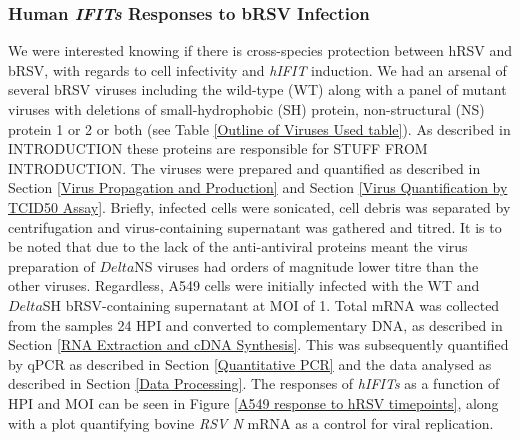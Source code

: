 \subsubsection{Human \textit{IFITs} Responses to bRSV Infection} \label{Human IFITs Responses to bRSV}
We were interested knowing if there is cross-species protection between hRSV and bRSV, with regards to cell infectivity and \textit{hIFIT} induction. We had an arsenal of several bRSV viruses including the wild-type (WT) along with a panel of mutant viruses with deletions of small-hydrophobic (SH) protein, non-structural (NS) protein 1 or 2 or both (see Table \ref{Outline of Viruses Used table}). As described in INTRODUCTION these proteins are responsible for STUFF FROM INTRODUCTION. The viruses were prepared and quantified as described in Section \ref{Virus Propagation and Production} and Section \ref{Virus Quantification by TCID50 Assay}. Briefly, infected cells were sonicated, cell debris was separated by centrifugation and virus-containing supernatant was gathered and titred. It is to be noted that due to the lack of the anti-antiviral proteins meant the virus preparation of \(Delta\)NS viruses had orders of magnitude lower titre than the other viruses. Regardless, A549 cells were initially infected with the WT and \(Delta\)SH bRSV-containing supernatant at MOI of 1. Total mRNA was collected from the samples 24 HPI and converted to complementary DNA, as described in Section \ref{RNA Extraction and cDNA Synthesis}. This was subsequently quantified by qPCR as described in Section \ref{Quantitative PCR} and the data analysed as described in Section \ref{Data Processing}. The responses of \textit{hIFITs} as a function of HPI and MOI can be seen in Figure \ref{A549 response to hRSV timepoints}, along with a plot quantifying bovine \textit{RSV N} mRNA as a control for viral replication.

